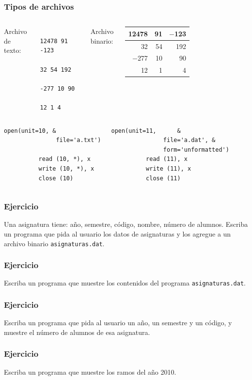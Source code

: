 \documentclass[12pt]{beamer}
\begin{document}
  \begin{frame}[fragile]
    \frametitle{Tipos de archivos}
    \begin{columns}
        Archivo de texto:\vspace{1ex}
        \begin{Verbatim}
          12478 91 -123
          32 54 192
          -277 10 90
          12 1 4
        \end{Verbatim}
        Archivo binario:\vspace{1ex}
        \begin{tabular}{|r|r|r|}\hline
          12478 & 91 & $-$123 \\\hline
             32 & 54 &    192 \\\hline
         $-$277 & 10 &     90 \\\hline
             12 & \phantom{0000}1 & \phantom{0000}4 \\\hline
        \end{tabular}
    \end{columns}
    \pause
    \begin{columns}
        \begin{lstlisting}[gobble=10]
          open(unit=10, &
               file='a.txt')

          read (10, *), x
          write (10, *), x
          close (10)
        \end{lstlisting}
        \begin{lstlisting}[gobble=10]
          open(unit=11,      &
               file='a.dat', &
               form='unformatted')
          read (11), x
          write (11), x
          close (11)
        \end{lstlisting}
    \end{columns}

\end{frame}

  \begin{frame}
    \frametitle{Ejercicio}
    Una asignatura tiene:
    año, semestre, código, nombre, número de alumnos.
    Escriba un programa
    que pida al usuario los datos de asignaturas
    y los agregue a un archivo binario \texttt{asignaturas.dat}.
  \end{frame}

  \begin{frame}
    \frametitle{Ejercicio}
    Escriba un programa que muestre los contenidos
    del programa \texttt{asignaturas.dat}.
  \end{frame}

  \begin{frame}
    \frametitle{Ejercicio}
    Escriba un programa que pida al usuario
    un año, un semestre y un código,
    y muestre el número de alumnos de esa asignatura.
  \end{frame}

  \begin{frame}
    \frametitle{Ejercicio}
    Escriba un programa que muestre los ramos del año 2010.
  \end{frame}
\end{document}

